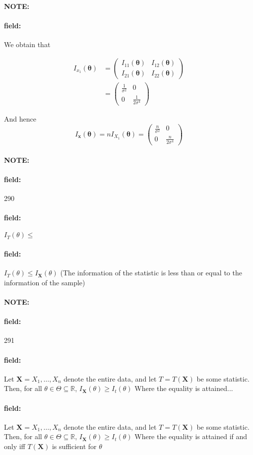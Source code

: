 \documentclass[12pt]{article}
\newenvironment{note}{\paragraph{NOTE:}}{}
\newenvironment{field}{\paragraph{field:}}{}
\begin{document}
\begin{note}
\begin{field}
    We obtain that

    \begin{align*}
      I_{x_1}(\boldsymbol\theta) &= \begin{pmatrix}
        I_{11}(\boldsymbol\theta) & I_{12}(\boldsymbol\theta)\\
        I_{21}(\boldsymbol\theta) & I_{22}(\boldsymbol\theta)
    \end{pmatrix}\\
    &= \begin{pmatrix}
      \frac{1}{\sigma^2} & 0 \\ 0 & \frac{1}{2\sigma^4}
    \end{pmatrix}
    \end{align*}


    And hence $$ I_{\mathbf{x}}(\boldsymbol\theta) = n I_{X_1}(\boldsymbol\theta) = \begin{pmatrix}
      \frac{n}{\sigma^2} & 0 \\ 0 & \frac{n}{2\sigma^4}
    \end{pmatrix} $$
  \end{field}
\end{note}

\begin{note} \begin{field} \tiny 290 \end{field}
  \begin{field}
    $I_T(\theta) \leq $
  \end{field}
  \begin{field}
    $I_T(\theta) \leq I_{\mathbf{X}}(\theta)$
    (The information of the statistic is less than or equal to the information of the sample)
  \end{field}
\end{note}


\begin{note} \begin{field} \tiny 291 \end{field}
  \begin{field}
    Let $\mathbf{X} = X_1, \ldots , X_n$ denote the entire data, and let $T = T(\mathbf{X})$ be some statistic. Then, for all $\theta \in \Theta \subseteq \mathbb{R}$, $I_{\mathbf{X}} (\theta) \geq I_t(\theta)$
    Where the equality is attained...
  \end{field}
  \begin{field}
    Let $\mathbf{X} = X_1, \ldots , X_n$ denote the entire data, and let $T = T(\mathbf{X})$ be some statistic. Then, for all $\theta \in \Theta \subseteq \mathbb{R}$, $I_{\mathbf{X}} (\theta) \geq I_t(\theta)$
    Where the equality is attained if and only iff $T(\mathbf{X})$ is sufficient for $\theta$
  \end{field}
\end{note}
\end{document}
